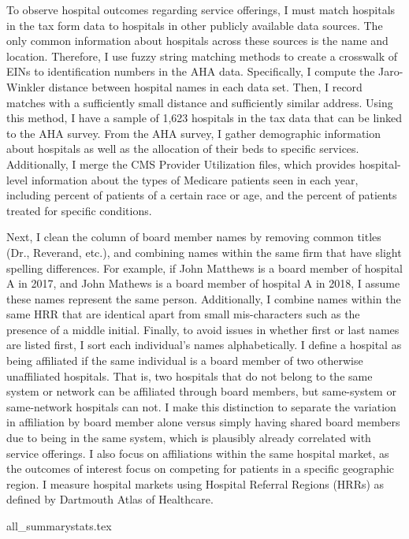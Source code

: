 \documentclass[12pt]{article}
\begin{document}
   To observe hospital outcomes regarding service offerings, I must match hospitals in the tax form data to hospitals in other publicly available data sources. The only common information about hospitals across these sources is the name and location. Therefore, I use fuzzy string matching methods to create a crosswalk of EINs to identification numbers in the AHA data. Specifically, I compute the Jaro-Winkler distance between hospital names in each data set. Then, I record matches with a sufficiently small distance and sufficiently similar address. Using this method, I have a sample of 1,623 hospitals in the tax data that can be linked to the AHA survey. From the AHA survey, I gather demographic information about hospitals as well as the allocation of their beds to specific services. Additionally, I merge the CMS Provider Utilization files, which provides hospital-level information about the types of Medicare patients seen in each year, including percent of patients of a certain race or age, and the percent of patients treated for specific conditions.

    Next, I clean the column of board member names by removing common titles (Dr., Reverand, etc.), and combining names within the same firm that have slight spelling differences. For example, if John Matthews is a board member of hospital A in 2017, and John Mathews is a board member of hospital A in 2018, I assume these names represent the same person. Additionally, I combine names within the same HRR that are identical apart from small mis-characters such as the presence of a middle initial. Finally, to avoid issues in whether first or last names are listed first, I sort each individual's names alphabetically. I define a hospital as being affiliated if the same individual is a board member of two otherwise unaffiliated hospitals. That is, two hospitals that do not belong to the same system or network can be affiliated through board members, but same-system or same-network hospitals can not. I make this distinction to separate the variation in affiliation by board member alone versus simply having shared board members due to being in the same system, which is plausibly already correlated with service offerings. I also focus on affiliations within the same hospital market, as the outcomes of interest focus on competing for patients in a specific geographic region. I measure hospital markets using Hospital Referral Regions (HRRs) as defined by Dartmouth Atlas of Healthcare.

    {all_summarystats.tex}
    
\end{document}
